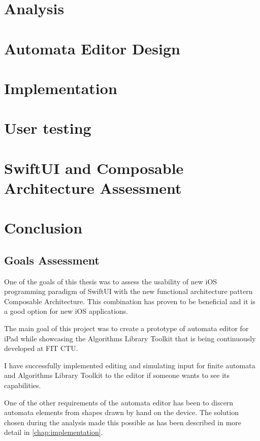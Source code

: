 \documentclass[thesis=B,english]{FITthesis}[2019/12/23]
\begin{document}
\chapter{Analysis}

\chapter{Automata Editor Design}

\chapter{Implementation}
\label{chap:implementation}

\chapter{User testing}

\chapter{SwiftUI and Composable Architecture Assessment}

\chapter{Conclusion}

\section{Goals Assessment}

One of the goals of this thesis was to assess the usability of new iOS programming paradigm of SwiftUI with the new functional architecture pattern Composable Architecture. This combination has proven to be beneficial and it is a good option for new iOS applications.

The main goal of this project was to create a prototype of automata editor for iPad while showcasing the Algorithms Library Toolkit that is being continuously developed at FIT CTU.

I have successfully implemented editing and simulating input for finite automata and Algorithms Library Toolkit to the editor if someone wants to see its capabilities.

One of the other requirements of the automata editor has been to discern automata elements from shapes drawn by hand on the device. The solution chosen during the analysis made this possible as has been described in more detail in \autoref{chap:implementation}.
\end{document}
